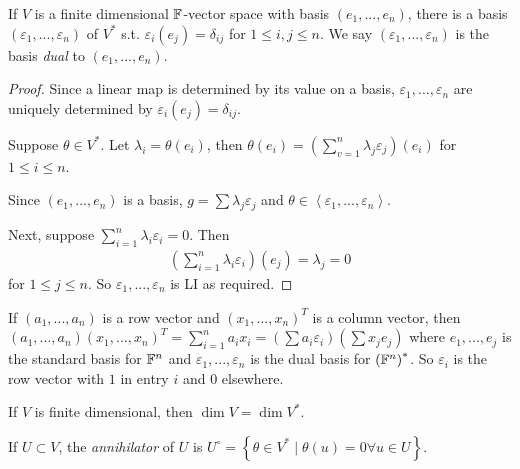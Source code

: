 \documentclass[a4paper]{article}
\begin{document}
\begin{lemma}
If $V$ is a finite dimensional $\mathbb{F}$-vector space with basis $\left(e_1,...,e_n\right)$, there is a basis $\left(\varepsilon_1,...,\varepsilon_n\right)$ of $V^*$ s.t. $\varepsilon_i\left(e_j\right) = \delta_{ij}$ for $1\leq i,j\leq n$. We say $\left(\varepsilon_1,...,\varepsilon_n\right)$ is the basis \emph{dual} to $\left(e_1,...,e_n\right)$.
\begin{proof}
Since a linear map is determined by its value on a basis, $\varepsilon_1,...,\varepsilon_n$ are uniquely determined by $\varepsilon_i\left(e_j\right) = \delta_{ij}$.

Suppose $\theta \in V^*$. Let $\lambda_i = \theta\left(e_i\right)$, then $\theta\left(e_i\right) = \left(\sum_{v=1}^n \lambda_j \varepsilon_j\right)\left(e_i\right)$ for $1 \leq i \leq n$.

Since $\left(e_1,...,e_n\right)$ is a basis, $g=\sum \lambda_j \varepsilon_j$ and $\theta\in \left<\varepsilon_1,...,\varepsilon_n\right>$.

Next, suppose $\sum_{i=1}^n \lambda_i \varepsilon_i = 0$. Then
\begin{equation*}
\begin{aligned}
\left(\sum_{i=1}^n\lambda_i \varepsilon_i\right)\left(e_j\right) = \lambda_j = 0
\end{aligned}
\end{equation*}
for $1\leq j \leq n$. So $\varepsilon_1,...,\varepsilon_n$ is LI as required.
\end{proof}
\end{lemma}

\begin{rem}
If $\left(a_1,...,a_n\right)$ is a row vector and $\left(x_1,...,x_n\right)^T$ is a column vector, then $\left(a_1,...,a_n\right)\left(x_1,...,x_n\right)^T = \sum_{i=1}^n a_i x_i = \left(\sum a_i \varepsilon_i\right)\left(\sum x_j e_j\right)$ where $e_1,...,e_j$ is the standard basis for $\mathbb{F}^n$ and $\varepsilon_1,...,\varepsilon_n$ is the dual basis for $\left(\mathbb{F}^n\right)^*$. So $\varepsilon_i$ is the row vector with $1$ in entry $i$ and $0$ elsewhere.
\end{rem}

\begin{coro}
If $V$ is finite dimensional, then $\dim V = \dim V^*$.
\end{coro}

\begin{defi}
If $U \subset V$, the \emph{annihilator} of $U$ is $U^\circ = \left\{ \theta \in V^* \mid \theta\left(u\right) = 0 \forall u \in U\right\}$.
\end{defi}
\end{document}
